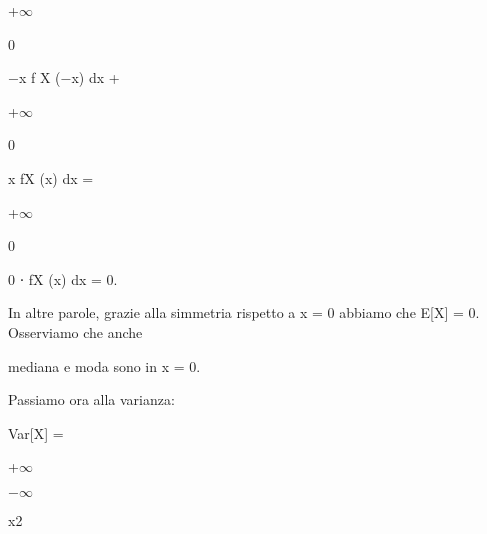 \documentclass[a4paper,portrait,12pt]{article}
\begin{document}
+$\infty$


0





\begin{flushleft}
$-$x f X ($-$x) dx +
\end{flushleft}





+$\infty$


0





\begin{flushleft}
x fX (x) dx =
\end{flushleft}





+$\infty$


0





\begin{flushleft}
0 ⋅ fX (x) dx = 0.
\end{flushleft}





\begin{flushleft}
In altre parole, grazie alla simmetria rispetto a x = 0 abbiamo che E[X] = 0. Osserviamo che anche
\end{flushleft}


\begin{flushleft}
mediana e moda sono in x = 0.
\end{flushleft}


\begin{flushleft}
Passiamo ora alla varianza:
\end{flushleft}


\begin{flushleft}
Var[X] =
\end{flushleft}





+$\infty$


$-$$\infty$





\begin{flushleft}
x2
\end{flushleft}
\end{document}
